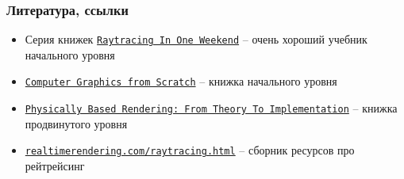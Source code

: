 \documentclass[10pt]{beamer}
\begin{document}
\begin{frame}
\frametitle{Литература, ссылки}
\begin{itemize}
\item Серия книжек \href{https://raytracing.github.io/}{\texttt{Raytracing In One Weekend}} -- очень хороший учебник начального уровня
\item \href{https://www.gabrielgambetta.com/computer-graphics-from-scratch/}{\texttt{Computer Graphics from Scratch}} -- книжка начального уровня
\item \href{https://www.pbr-book.org/}{\texttt{Physically Based Rendering: From Theory To Implementation}} -- книжка продвинутого уровня
\item \href{https://www.realtimerendering.com/raytracing.html}{\texttt{realtimerendering.com/raytracing.html}} -- сборник ресурсов про рейтрейсинг
\end{itemize}
\end{frame}
\end{document}
